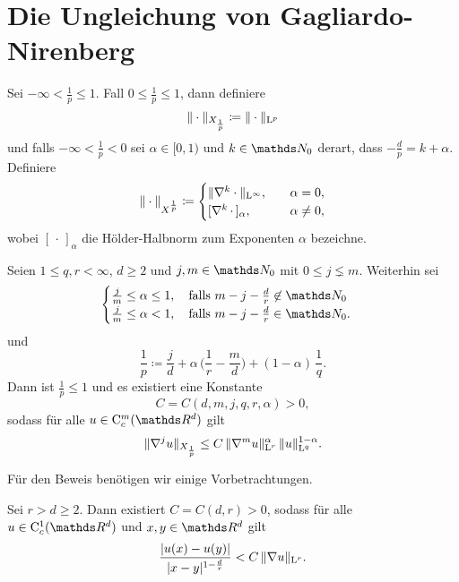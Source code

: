 \chapter{Die Ungleichung von Gagliardo-Nirenberg}

\begin{ntion}
  Sei $-\infty < \frac{1}{p} \leq 1$.
  Fall $0 \leq \frac{1}{p} \leq 1$, dann definiere
  $$
  \| \cdot \|_{X_{\frac{1}{p}}} \coloneqq \| \cdot \|_{\mathrm{L}^p}
  $$
  und falls $-\infty < \frac{1}{p} < 0$ sei $\alpha \in [0,1)$ und $k \in \N_0$ derart, dass $-\frac{d}{p} = k + \alpha$. Definiere
  $$
  \| \cdot \|_{X^{\frac{1}{p}}} \coloneqq 
  \begin{cases} 
    \| \nabla^k \cdot \|_{\mathrm{L}^\infty}, \quad &\alpha = 0, \\ [ \nabla^k \, \cdot \, ]_\alpha, \quad &\alpha \neq 0,
  \end{cases}
  $$
  wobei $[\,\cdot\,]_\alpha$ die Hölder-Halbnorm zum Exponenten $\alpha$ bezeichne.
\end{ntion}

\begin{hsatz}
  \label{hsatz:gagliardoNirenberg}
  Seien $1 \leq q,r < \infty$, $d \geq 2$ und $j,m \in \N_0$ mit $0 \leq j \lneq m$.
  Weiterhin sei
  $$
  \begin{cases}
    \frac{j}{m} \leq \alpha \leq 1, \quad \text{falls } m - j - \frac{d}{r} \not\in \N_0 \\
    \frac{j}{m} \leq \alpha < 1, \quad \text{falls } m - j - \frac{d}{r} \in \N_0.
  \end{cases}
    $$
    und
    $$
    \frac{1}{p} \coloneqq \frac{j}{d} + \alpha\, \Big( \frac{1}{r} - \frac{m}{d} \Big) + (1 - \alpha) \, \frac{1}{q}.
    $$
    Dann ist $\frac{1}{p} \leq 1$ und es existiert eine Konstante
    $$
    C = C(d,m,j,q,r,\alpha) > 0,
    $$
    sodass für alle $u \in \CC_c^m(\R^d)$ gilt
    $$
    \| \nabla^j u\|_{X_{\frac{1}{p}}} \leq C \, \|\nabla^m u\|_{\mathrm{L}^r}^\alpha \, \|u\|_{\mathrm{L}^q}^{1 - \alpha}.
    $$
\end{hsatz}

Für den Beweis benötigen wir einige Vorbetrachtungen.

\begin{lem}
  \label{lem:hoelderIneq}
  Sei $r > d \geq 2$.
  Dann existiert $C = C(d,r) > 0$, sodass für alle $u \in \CC_c^1(\R^d)$ und $x,y \in \R^d$ gilt
  $$
  \frac{\left| u(x) - u(y) \right|}{|x - y|^{1 - \frac{d}{r}}} < C \, \|\nabla u\|_{\mathrm{L}^r}.
  $$
\end{lem}

